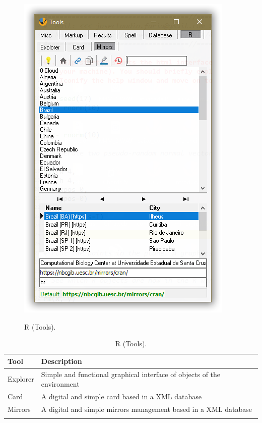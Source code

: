 \begin{figure}[H]
  \includegraphics[scale=0.35]{./res/tools_r_mirrors.png}\\
  \caption{R (Tools).}
  \label{fig:tools_r}
\end{figure}

\begin{table}
  \begin{footnotesize}
    \begin{tabularx}{\textwidth}{>{\hsize=0.3\hsize}X>{\hsize=0.7\hsize}X}\\
      \hline
      \textbf{Tool} & \textbf{Description} \\
      \hline
      Explorer & Simple and functional graphical interface of objects of the \RR{} environment \\
      Card & A digital and simple \RR{} card based in a XML database \\
      Mirrors & A digital and simple \RR{} mirrors management based in a XML database \\
      \hline
      \\
    \end{tabularx}
  \end{footnotesize}
  \caption{R (Tools).}
  \label{tab:tools_r}
\end{table}

